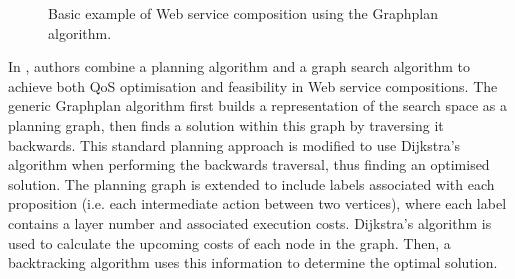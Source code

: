 \begin{figure}
\centerline{
}
\caption{Basic example of Web service composition using the Graphplan algorithm.}
\label{fig:graphplan}
\end{figure}

In \cite{chen2014qos}, authors combine a planning algorithm and a graph search algorithm to achieve both QoS optimisation and feasibility in Web service compositions. The generic Graphplan algorithm first builds a representation of the search space as a planning graph, then finds a solution within this graph by traversing it backwards. This standard planning approach is modified to use Dijkstra's algorithm \cite{skiena1990dijkstra} when performing the backwards traversal, thus finding an optimised solution. The planning graph is extended to include labels associated with each proposition (i.e. each intermediate action between two vertices), where each label contains a layer number and associated execution costs. Dijkstra's algorithm is used to calculate the upcoming costs of each node in the graph. Then, a backtracking algorithm uses this information to determine the optimal solution.

